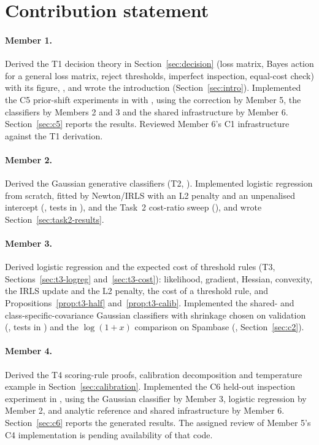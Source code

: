 \section{Contribution statement}
\label{sec:contrib}
\paragraph{Member 1.} Derived the T1 decision theory in Section~\ref{sec:decision} (loss matrix,
Bayes action for a general loss matrix, reject thresholds, imperfect inspection, equal-cost check) with its
figure, , and wrote the introduction (Section~\ref{sec:intro}).
Implemented the C5 prior-shift experiments in  with
, using the correction by Member 5, the classifiers by Members 2 and 3 and
the shared infrastructure by Member 6. Section~\ref{sec:c5} reports the results. Reviewed Member 6's C1
infrastructure against the T1 derivation.

\paragraph{Member 2.} Derived the Gaussian generative classifiers (T2,
). Implemented logistic regression from scratch, fitted by
Newton/IRLS with an L2 penalty and an unpenalised intercept (, tests in
), and the Task~2 cost-ratio sweep
(), and wrote Section~\ref{sec:task2-results}.

\paragraph{Member 3.} Derived logistic regression and the expected cost of threshold rules (T3,
Sections~\ref{sec:t3-logreg} and~\ref{sec:t3-cost}): likelihood, gradient, Hessian, convexity, the IRLS
update and the L2 penalty, the cost of a threshold rule, and Propositions~\ref{prop:t3-half}
and~\ref{prop:t3-calib}. Implemented the shared- and class-specific-covariance Gaussian classifiers with
shrinkage chosen on validation (, tests in )
and the $\log(1+x)$ comparison on Spambase (,
Section~\ref{sec:c2}).

\paragraph{Member 4.} Derived the T4 scoring-rule proofs, calibration decomposition and
temperature example in Section~\ref{sec:calibration}. Implemented the C6 held-out
inspection experiment in , using the Gaussian
classifier by Member 3, logistic regression by Member 2, and analytic reference and shared
infrastructure by Member 6. Section~\ref{sec:c6} reports the generated results.
The assigned review of Member 5's C4 implementation is pending availability of that code.

